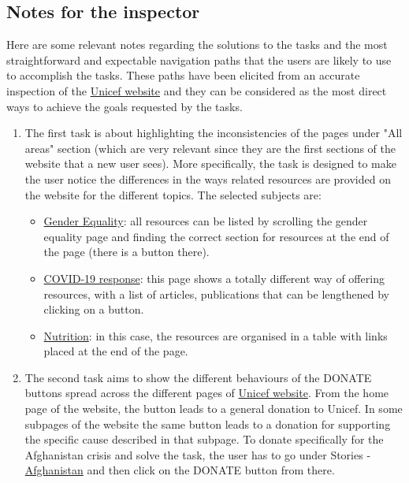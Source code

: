 \documentclass[11pt]{article}
\begin{document}
	\subsection*{Notes for the inspector}
	Here are some relevant notes regarding the solutions to the tasks and the most straightforward and expectable navigation paths that the users are likely to use to accomplish the tasks. These paths have been elicited from an accurate inspection of the \href{https://www.unicef.org/}{Unicef website} and they can be considered as the most direct ways to achieve the goals requested by the tasks.
	\begin{enumerate}
		\item The first task is about highlighting the inconsistencies of the pages under "All areas" section (which are very relevant since they are the first sections of the website that a new user sees). 
		More specifically, the task is designed to make the user notice the differences in the ways related resources are provided on the website for the different topics. The selected subjects are:
		\begin{itemize}
			\item \href{https://www.unicef.org/gender-equality}{Gender Equality}: all resources can be listed by scrolling the gender equality page and finding the correct section for resources at the end of the page (there is a button there).
			\item \href{https://www.unicef.org/coronavirus/covid-19}{COVID-19 response}: this page shows a totally different way of offering resources, with a list of articles, publications that can be lengthened by clicking on a button.
			\item \href{https://www.unicef.org/nutrition}{Nutrition}: in this case, the resources are organised in a table with links placed at the end of the page.
		\end{itemize}
		\item The second task aims to show the different behaviours of the DONATE buttons spread across the different pages of \href{https://www.unicef.org/}{Unicef website}. From the home page of the website, the button leads to a general donation to Unicef. In some subpages of the website the same button leads to a donation for supporting the specific cause described in that subpage. To donate specifically for the Afghanistan crisis and solve the task, the user has to go under Stories - \href{https://www.unicef.org/emergencies/delivering-support-afghanistans-children}{Afghanistan} and then click on the DONATE button from there.

\end{enumerate}
\end{document}
